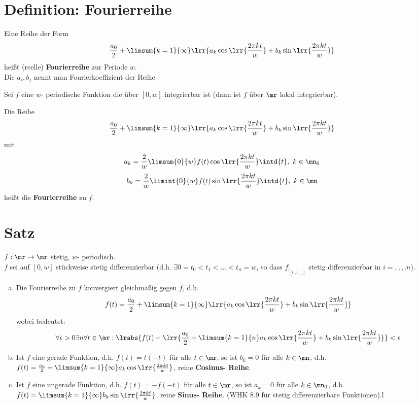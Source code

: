 \section{Definition: Fourierreihe}
	\item Eine Reihe der Form
	\[\dfrac{a_0}{2}+\limsum{k=1}{\infty}\lrr{a_k\cos\lrr{\frac{2\pi kt}{w}}+b_k\sin\lrr{\dfrac{2\pi kt}{w}}}\]
	heißt (reelle) \textbf{Fourierreihe} zur Periode $ w $.\\
	Die $ a_i,b_j $ nennt man Fourierkoeffizient der Reihe
	\item Sei $ f $ eine $ w $- periodische Funktion die über $ [0,w] $ integrierbar ist (dann ist $ f $ über $ \mr $ lokal integrierbar).
	
	Die Reihe
	\[\dfrac{a_0}{2}+\limsum{k=1}{\infty}\lrr{a_k\cos\lrr{\frac{2\pi kt}{w}}+b_k\sin\lrr{\dfrac{2\pi kt}{w}}}\]
	mit
	\[a_k=\frac{2}{w}\limsum{0}{w}f(t)\cos\lrr{\dfrac{2\pi kt}{w}}\intd{t},\ k\in\mn_0\]
	\[b_k=\frac{2}{w}\limint{0}{w}f(t)\sin\lrr{\dfrac{2\pi kt}{w}}\intd{t},\ k\in\mn\]
	heißt die \textbf{Fourierreihe} zu $ f $.
	\subExEnd
	
\section{Satz}
	$ f:\mr\rightarrow\mr $ stetig, $ w $- periodisch.\\
	$ f $ sei auf $[0,w]$ stückweise stetig differenzierbar (d.h. $\exists 0=t_0<t_1<...<t_n=w$, so dass $f_{|_{[t_1,t_{i+1}]}}$ stetig differenzierbar in $i=,,,.n$).
	\begin{enumerate}[a)]
	\item Die Fourierreihe zu $f$ konvergiert gleichmäßig gegen $f$, d.h.
	\[f(t)=\dfrac{a_0}{2}+\limsum{k=1}{\infty}\lrr{a_k\cos\lrr{\dfrac{2\pi kt}{w}}+b_k\sin\lrr{\dfrac{2\pi kt}{w}}}\]
	wobei  bedeutet: \[\forall\epsilon>0\exists n\forall t\in\mr: \lrabs{f(t)-\lrr{\dfrac{a_0}{2}+\limsum{k=1}{n}a_k\cos\lrr{\dfrac{2\pi kt}{w}}+b_k\sin\lrr{\dfrac{2\pi kt}{w}}}}<\epsilon\]
	\item Ist $f$ eine gerade Funktion, d.h. $f(t)=t(-t)$ für alle $t\in\mr$, so ist $b_k=0$ für alle $k\in\mn$, d.h. $f(t)=\frac{a_0}{2}+\limsum{k=1}{\infty}a_k\cos\lrr{\frac{2\pi kt}{w}}$, reine \textbf{Cosinus- Reihe}.
	\item Ist $f$ eine ungerade Funktion, d.h. $f(t)=-f(-t)$ für alle $t\in\mr$, so ist $a_k=0$ für alle $k\in\mn_0$, d.h. $f(t)=\limsum{k=1}{\infty}b_k\sin\lrr{\frac{2\pi kt}{w}}$, reine \textbf{Sinus- Reihe}. (WHK 8.9 für stetig differenzierbare Funktionen).l
	\end{enumerate}
	
